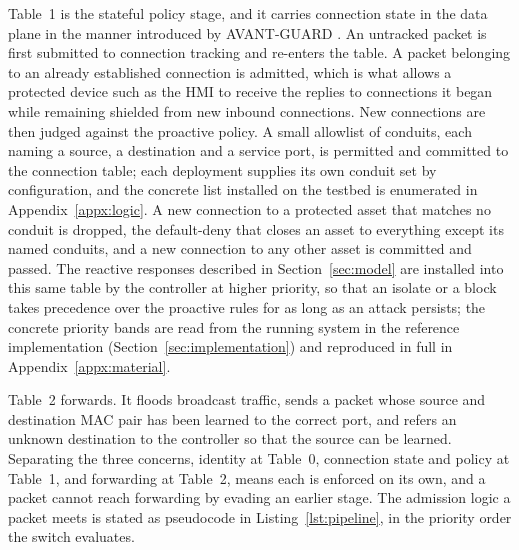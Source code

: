 Table~1 is the stateful policy stage, and it carries connection state in the data plane in the manner introduced by AVANT-GUARD \cite{shin2013avantguard}. An untracked packet is first submitted to connection tracking and re-enters the table. A packet belonging to an already established connection is admitted, which is what allows a protected device such as the HMI to receive the replies to connections it began while remaining shielded from new inbound connections. New connections are then judged against the proactive policy. A small allowlist of conduits, each naming a source, a destination and a service port, is permitted and committed to the connection table; each deployment supplies its own conduit set by configuration, and the concrete list installed on the testbed is enumerated in Appendix~\ref{appx:logic}. A new connection to a protected asset that matches no conduit is dropped, the default-deny that closes an asset to everything except its named conduits, and a new connection to any other asset is committed and passed. The reactive responses described in Section~\ref{sec:model} are installed into this same table by the controller at higher priority, so that an isolate or a block takes precedence over the proactive rules for as long as an attack persists; the concrete priority bands are read from the running system in the reference implementation (Section~\ref{sec:implementation}) and reproduced in full in Appendix~\ref{appx:material}.

Table~2 forwards. It floods broadcast traffic, sends a packet whose source and destination MAC pair has been learned to the correct port, and refers an unknown destination to the controller so that the source can be learned. Separating the three concerns, identity at Table~0, connection state and policy at Table~1, and forwarding at Table~2, means each is enforced on its own, and a packet cannot reach forwarding by evading an earlier stage. The admission logic a packet meets is stated as pseudocode in Listing~\ref{lst:pipeline}, in the priority order the switch evaluates.

